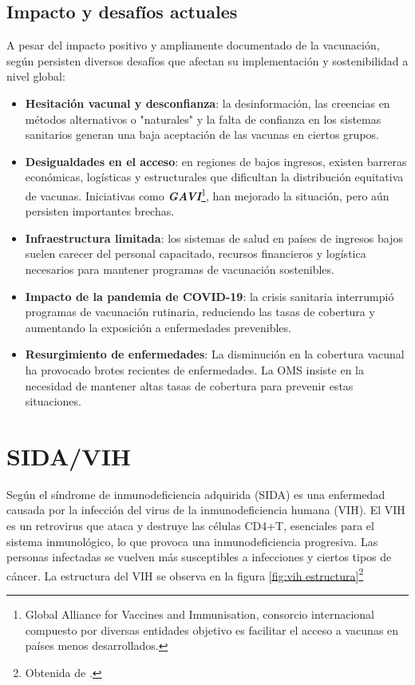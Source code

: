\subsection{Impacto y desafíos actuales}
A pesar del impacto positivo y ampliamente documentado de la vacunación, según \cite{lindstrand2021world}persisten diversos desafíos que afectan su implementación y sostenibilidad a nivel global:
\begin{itemize}
    \item \textbf{Hesitación vacunal y desconfianza}: la desinformación, las creencias en métodos alternativos o "naturales" y la falta de confianza en los sistemas sanitarios generan una baja aceptación de las vacunas en ciertos grupos. 
    \item \textbf{Desigualdades en el acceso}: en regiones de bajos ingresos, existen barreras económicas, logísticas y estructurales que dificultan la distribución equitativa de vacunas. Iniciativas como \textbf{\textit{GAVI}}\footnote{Global Alliance for Vaccines and Immunisation, consorcio internacional compuesto por diversas entidades objetivo es facilitar el acceso a vacunas en países menos desarrollados.}, han mejorado la situación, pero aún persisten importantes brechas.
    \item \textbf{Infraestructura limitada}: los sistemas de salud en países de ingresos bajos suelen carecer del personal capacitado, recursos financieros y logística necesarios para mantener programas de vacunación sostenibles.
    \item \textbf{Impacto de la pandemia de COVID-19}: la crisis sanitaria interrumpió programas de vacunación rutinaria, reduciendo las tasas de cobertura y aumentando la exposición a enfermedades prevenibles.
    \item \textbf{Resurgimiento de enfermedades}: La disminución en la cobertura vacunal ha provocado brotes recientes de enfermedades. La OMS insiste en la necesidad de mantener altas tasas de cobertura para prevenir estas situaciones.
\end{itemize}



\section{SIDA/VIH}
Según \cite{sudharshan2008introduction.} el síndrome de inmunodeficiencia adquirida (SIDA)  es una enfermedad causada por la infección del virus de la inmunodeficiencia humana (VIH). El VIH es un retrovirus que ataca y destruye las células CD4+T, esenciales para el sistema inmunológico, lo que provoca una inmunodeficiencia progresiva. Las personas infectadas se vuelven más susceptibles a infecciones y ciertos tipos de cáncer. La estructura del VIH se observa en la figura \ref{fig:vih estructura}\footnote{Obtenida de \cite{infosida_vih}.}


